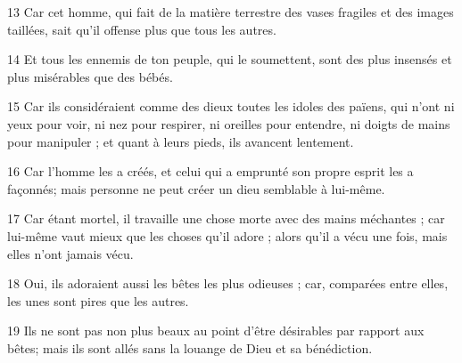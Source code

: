 \par 13 Car cet homme, qui fait de la matière terrestre des vases fragiles et des images taillées, sait qu'il offense plus que tous les autres.
\par 14 Et tous les ennemis de ton peuple, qui le soumettent, sont des plus insensés et plus misérables que des bébés.
\par 15 Car ils considéraient comme des dieux toutes les idoles des païens, qui n'ont ni yeux pour voir, ni nez pour respirer, ni oreilles pour entendre, ni doigts de mains pour manipuler ; et quant à leurs pieds, ils avancent lentement.
\par 16 Car l'homme les a créés, et celui qui a emprunté son propre esprit les a façonnés; mais personne ne peut créer un dieu semblable à lui-même.
\par 17 Car étant mortel, il travaille une chose morte avec des mains méchantes ; car lui-même vaut mieux que les choses qu'il adore ; alors qu'il a vécu une fois, mais elles n'ont jamais vécu.
\par 18 Oui, ils adoraient aussi les bêtes les plus odieuses ; car, comparées entre elles, les unes sont pires que les autres.
\par 19 Ils ne sont pas non plus beaux au point d'être désirables par rapport aux bêtes; mais ils sont allés sans la louange de Dieu et sa bénédiction.


